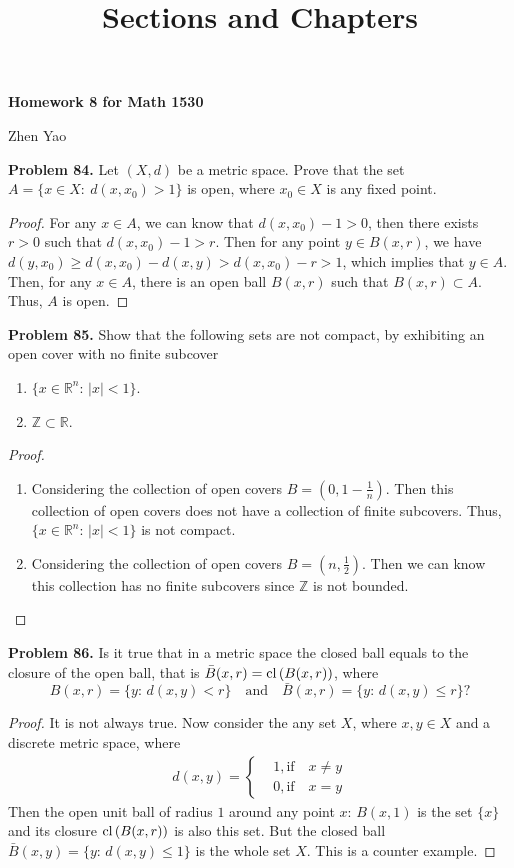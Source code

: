 \documentclass[12pt,leqno]{amsart}
\title{Sections and Chapters}
\theoremstyle{definition}
\numberwithin{equation}{subsection}
\begin{document}
\centerline{\bf Homework 8 for Math 1530}
\centerline{Zhen Yao}

\bigskip

\noindent
{\bf Problem 84.}
Let $(X,d)$ be a metric space. Prove that the set
$
A = \{x\in X:\ d(x,x_0)>1\}
$
is open, where $x_0\in X$ is any fixed point.
\begin{proof}
For any $x\in A$, we can know that $d(x,x_0) - 1 > 0$, then there exists $r > 0$ such that $d(x,x_0) - 1 > r$. Then for any point $y\in B(x,r)$, we have $d(y,x_0) \geq d(x,x_0) - d(x,y) > d(x,x_0) - r > 1$, which implies that $y\in A$. Then, for any $x\in A$, there is an open ball $B(x,r)$ such that $B(x,r)\subset A$. Thus, $A$ is open.
\end{proof}

\medskip

\noindent
{\bf Problem 85.}
Show that the following sets are not compact, by exhibiting an open
cover with no finite subcover
\begin{enumerate}[label=(\alph*)]
 \item $\{ x\in\mathbb{R}^n:\, |x|<1\}$.
 \item $\mathbb{Z}\subset\mathbb{R}$.
\end{enumerate}
\begin{proof}
~\begin{enumerate}[label=(\alph*)]
    \item Considering the collection of open covers $B = \left(0, 1 - \frac{1}{n}\right)$. Then this collection of open covers does not have a collection of finite subcovers. Thus, $\{ x\in\mathbb{R}^n:\, |x|<1\}$ is not compact. 
    \item Considering the collection of open covers $B = \left(n, \frac{1}{2}\right)$. Then we can know this collection has no finite subcovers since $\mathbb{Z}$ is not bounded.
\end{enumerate}
\end{proof}

\medskip

\noindent
{\bf Problem 86.}
Is it true that in a metric space the closed ball equals to the closure of the open ball, that is
$\bar{B}(x,r)={\rm cl}\,(B(x,r))$, where
$$
B(x,r)=\{y:\, d(x,y)< r\}
\quad
\text{and}
\quad
\bar{B}(x,r)=\{y:\, d(x,y)\leq r\}?
$$
\begin{proof}
It is not always true. Now consider the any set $X$, where $x,y\in X$ and a discrete metric space, where
\begin{align*}
    d(x,y) = \left\{
    \begin{aligned}
    & 1, \text{if} \quad x \neq y\\
    & 0, \text{if} \quad x = y
    \end{aligned}
    \right.
\end{align*}
Then the open unit ball of radius $1$ around any point $x$: $B(x,1)$ is the set $\{x\}$ and its closure ${\rm cl}\,(B(x,r))$ is also this set. But the closed ball $\bar{B}(x,y)=\{y:\, d(x,y)\leq 1\}$ is the whole set $X$. This is a counter example. 
\end{proof}
\end{document}
